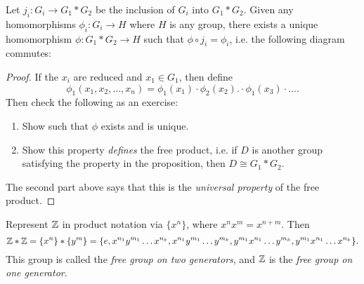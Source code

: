 \begin{prop}
  Let $j_i : G_i \to G_1 * G_2$ be the inclusion
  of $G_i$ into $G_1 * G_2$. Given any homomorphisms
  $\phi_i : G_i \to H$ where $H$ is any group, there
  exists a unique homomorphism
  $\phi : G_1 * G_2 \to H$ such that
  $\phi \circ j_i = \phi_i$, i.e.
  the following diagram commutes:
  \begin{center}
  \end{center}
\end{prop}

\begin{proof}
  If the $x_i$ are reduced and $x_1 \in G_1$, then define
  \[
    \phi_1(x_1, x_2, \dots, x_n) = \phi_1(x_1) \cdot \phi_2(x_2) .\cdot \phi_1(x_3) \cdot \dots.
  \]
  Then check the following as an exercise:
  \begin{enumerate}
    \item Show such that $\phi$ exists and is unique.
    \item Show this property \emph{defines} the
      free product, i.e. if $D$ is another group
      satisfying the property in the proposition, then
      $D \cong G_1 * G_2$.
  \end{enumerate}
  The second part above says that this is
  the \emph{universal property} of the free product.
\end{proof}

\begin{example}
  Represent $\mathbb{Z}$ in product notation via $\{x^n\}$, where
  $x^n x^m = x^{n + m}$. Then
  \[
    \mathbb{Z} * \mathbb{Z} = \{x^n\} * \{y^m\}
    = \{e,
      x^{n_1} y^{m_1} \dots x^{n_k},
      x^{n_1} y^{m_1} \dots y^{m_k},
      y^{m_1} x^{n_1} \dots y^{m_k},
      y^{m_1} x^{n_1} \dots x^{n_k}
    \}.
  \]
  This group is called the \emph{free group on
  two generators}, and $\mathbb{Z}$ is the
  \emph{free group on one generator}.
\end{example}
